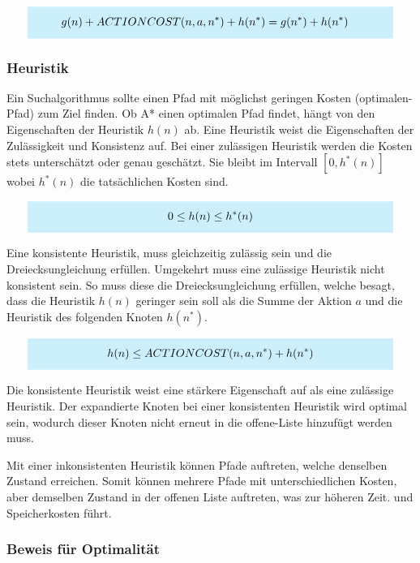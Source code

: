 \[
\highlightbox{0.9\textwidth}{$
    \begin{aligned}
			g(n) + ACTIONCOST(n,a,n^*) + h(n^*) &= g(n^*) + h(n^*)
    \end{aligned}
$}
\]

\subsubsection{Heuristik}

Ein Suchalgorithmus sollte einen Pfad mit möglichst geringen Kosten (optimalen-Pfad) zum Ziel finden. Ob A* einen optimalen Pfad findet, hängt von den Eigenschaften der Heuristik $h(n)$ ab. Eine Heuristik weist die Eigenschaften der Zulässigkeit und Konsistenz auf. Bei einer zulässigen Heuristik werden die Kosten stets unterschätzt oder genau geschätzt. Sie bleibt im Intervall $[0, h^{\ast}(n)]$ wobei $h^{\ast}(n)$ die tatsächlichen Kosten sind.

\[
\highlightbox{0.9\textwidth}{$
    \begin{aligned}
			0 \leq h(n) \leq h^*(n)
    \end{aligned}
$}
\]

Eine konsistente Heuristik, muss gleichzeitig zulässig sein und die Dreiecksungleichung erfüllen. Umgekehrt muss eine zulässige Heuristik nicht konsistent sein. So muss diese die Dreiecksungleichung erfüllen, welche besagt, dass die Heuristik $h(n)$ geringer sein soll als die Summe der Aktion $a$ und die Heuristik des folgenden Knoten $h(n^*)$.

\[
\highlightbox{0.9\textwidth}{$
    \begin{aligned}
			h(n) \leq ACTIONCOST(n,a,n^*) + h(n^*)
    \end{aligned}
$}
\]

Die konsistente Heuristik weist eine stärkere Eigenschaft auf als eine zulässige Heuristik. Der expandierte Knoten bei einer konsistenten Heuristik wird optimal sein, wodurch dieser Knoten nicht erneut in die offene-Liste hinzufügt werden muss.

Mit einer inkonsistenten Heuristik können Pfade auftreten, welche denselben Zustand erreichen. Somit können mehrere Pfade mit unterschiedlichen Kosten, aber demselben Zustand in der offenen Liste auftreten, was zur höheren Zeit. und Speicherkosten führt.

\subsubsection{Beweis für Optimalität}

